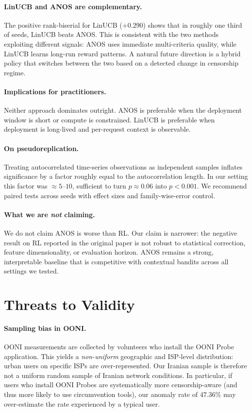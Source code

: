 \documentclass[11pt,a4paper]{article}
\begin{document}
\paragraph{LinUCB and ANOS are complementary.}
The positive rank-biserial for LinUCB ($+0.290$) shows that in
roughly one third of seeds, LinUCB beats ANOS. This is consistent
with the two methods exploiting different signals: ANOS uses
immediate multi-criteria quality, while LinUCB learns long-run
reward patterns. A natural future direction is a hybrid policy
that switches between the two based on a detected change in
censorship regime.

\paragraph{Implications for practitioners.}
Neither approach dominates outright. ANOS is preferable when the
deployment window is short or compute is constrained. LinUCB is
preferable when deployment is long-lived and per-request context
is observable.

\paragraph{On pseudoreplication.}
Treating autocorrelated time-series observations as independent
samples inflates significance by a factor roughly equal to the
autocorrelation length. In our setting this factor was
$\approx 5$--$10$, sufficient to turn $p \approx 0.06$ into
$p < 0.001$. We recommend paired tests across seeds with effect
sizes and family-wise-error control.

\paragraph{What we are \emph{not} claiming.}
We do not claim ANOS is worse than RL. Our claim is narrower: the
negative result on RL reported in the original paper is not robust
to statistical correction, feature dimensionality, or evaluation
horizon. ANOS remains a strong, interpretable baseline that is
competitive with contextual bandits across all settings we tested.

\section{Threats to Validity}
\label{sec:threats}

\paragraph{Sampling bias in OONI.}
OONI measurements are collected by volunteers who install the OONI
Probe application. This yields a \emph{non-uniform} geographic and
ISP-level distribution: urban users on specific ISPs are
over-represented. Our Iranian sample is therefore not a uniform
random sample of Iranian network conditions. In particular, if
users who install OONI Probes are systematically more
censorship-aware (and thus more likely to use circumvention tools),
our anomaly rate of $47.36\%$ may over-estimate the rate
experienced by a typical user.
\end{document}
